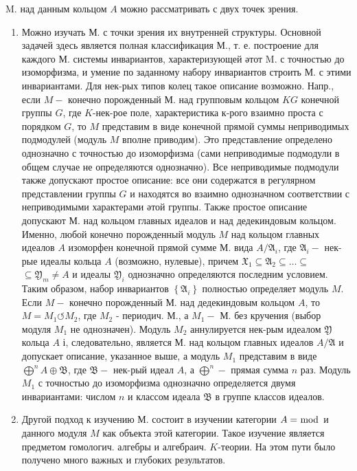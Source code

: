 \documentclass[10pt]{article}
\begin{document}
M. над данным кольцом $A$ можно рассматривать с двух точек зрения.



\begin{enumerate}

  \item Можно изучать М. с точки зрения их внутренней структуры. Основной задачей здесь является полная классификация М., т. е. построение для каждого М. системы инвариантов, характеризующей әтот M. с точностью до изоморфизма, и умение по заданному набору инвариантов строить М. с этими инвариантами. Для нек-рых типов колец такое описание возможно. Напр., если $M-$ конечно порожденный М. над групповым кольцом $K G$ конечной группы $G$, где $K$-нек-рое поле, характеристика к-рого взаимно проста с порядком $G$, то $M$ представим в виде конечной прямой суммы неприводимых подмодулей (модуль $M$ вполне приводим). Это представление определено однозначно с точностью до изоморфизма (сами неприводимые подмодули в общем случае не определяются однозначно). Все неприводимые подмодули также допускают простое описание: все они содержатся в регулярном представлении группы $G$ и находятся во взаимно однозначном соответствии с неприводимыми характерами әтой группы. Также простое описание допускают М. над кольцом главных идеалов и над дедекиндовым кольцом. Именно, любой конечно порожденный модуль $M$ над кольцом главных идеалов $A$ изоморфен конечной прямой сумме М. вида $A / \mathfrak{A}_{i}$, где $\mathfrak{A}_{i}-$ нек-рые идеалы кольца $A$ (возможно, нулевые), причем $\mathfrak{X}_{1} \subseteq \mathfrak{A}_{2} \subseteq \ldots \subseteq$ $\subseteq \mathfrak{Y}_{m} \neq A$ и идеалы $\mathfrak{Y}_{i}$ однозначно определяются последним условием. Таким образом, набор инвариантов $\left\{\mathfrak{A}_{i}\right\}$ полностью определяет модуль $M$. Если $M-$ конечно порожденный М. над дедекиндовым кольцом $A$, то $M=M_{1} \circlearrowleft M_{2}$, где $M_{2}$ - периодич. М., а $M_{1}-$ М. без кручения (выбор модуля $M_{1}$ не однозначен). Модуль $M_{2}$ аннулируется нек-рым идеалом $\mathfrak{Y}$ кольца $A$ і, следовательно, является М. над кольцом главных идеалов $A / \mathfrak{A}$ и допускает описание, указанное выше, а модуль $M_{1}$ представим в виде $\bigoplus^{n} A \oplus \mathfrak{B}$, где $\mathfrak{B}-$ нек-рый идеал $A$, а $\bigoplus^{n}-$ прямая сумма $n$ раз. Модуль $M_{1}$ с точностью до изоморфизма однозначно определяется двумя инвариантами: числом $n$ и классом идеала $\mathfrak{B}$ в группе классов идеалов.



  \item Другой подход к изучению М. состоит в изучении категории $A=\bmod$ и данного модуля $M$ как объекта этой категории. Такое изучение является предметом гомологич. алгебры и алгебраич. $K$-теории. На этом пути было получено много важных и глубоких результатов.



\end{enumerate}
\end{document}
